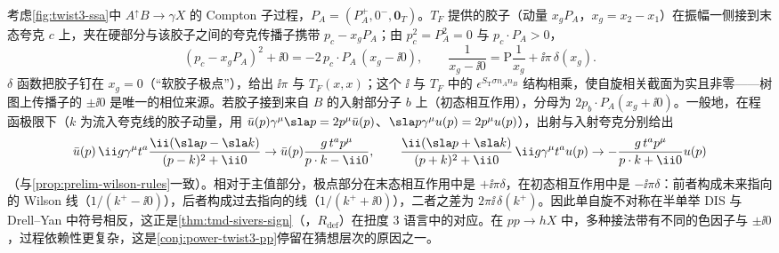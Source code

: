 \begin{example}[最低阶的软胶子极点机制]\label{ex:power-sgp}
考虑\cref{fig:twist3-ssa}中 $A^\uparrow B\to\gamma X$ 的 Compton 子过程，$P_A=(P_A^+,0^-,\mathbf0_T)$。$T_F$ 提供的胶子（动量 $x_gP_A$，$x_g=x_2-x_1$）在振幅一侧接到末态夸克 $c$ 上，夹在硬部分与该胶子之间的夸克传播子携带 $p_c-x_gP_A$；由 $p_c^2=P_A^2=0$ 与 $p_c\cdot P_A>0$，
\begin{equation}\label{eq:power-sgp-den}
(p_c-x_gP_A)^2+\ii0=-2\,p_c\cdot P_A\,(x_g-\ii0),\qquad \frac{1}{x_g-\ii0}=\mathrm P\frac{1}{x_g}+\ii\pi\,\delta(x_g).
\end{equation}
$\delta$ 函数把胶子钉在 $x_g=0$（“软胶子极点”），给出 $\ii\pi$ 与 $T_F(x,x)$；这个 $\ii$ 与 $T_F$ 中的 $\epsilon^{S_{\mathrm T}\sigma n_An_B}$ 结构相乘，使自旋相关截面为实且非零——树图上传播子的 $\pm\ii0$ 是唯一的相位来源。若胶子接到来自 $B$ 的入射部分子 $b$ 上（初态相互作用），分母为 $2p_b\cdot P_A(x_g+\ii0)$。一般地，在程函极限下（$k$ 为流入夸克线的胶子动量，用 $\bar u(p)\gamma^\mu\sla p=2p^\mu\bar u(p)$、$\sla p\gamma^\mu u(p)=2p^\mu u(p)$），出射与入射夸克分别给出
\begin{equation}\label{eq:power-sgp-eik}
\bar u(p)\,\ii g\gamma^\mu t^a\frac{\ii(\sla p-\sla k)}{(p-k)^2+\ii0}\to\bar u(p)\frac{g\,t^ap^\mu}{p\cdot k-\ii0},\qquad
\frac{\ii(\sla p+\sla k)}{(p+k)^2+\ii0}\,\ii g\gamma^\mu t^au(p)\to-\frac{g\,t^ap^\mu}{p\cdot k+\ii0}u(p)
\end{equation}
（与\cref{prop:prelim-wilson-rules}一致）。相对于主值部分，极点部分在末态相互作用中是 $+\ii\pi\delta$，在初态相互作用中是 $-\ii\pi\delta$：前者构成未来指向的 Wilson 线（$1/(k^+-\ii0)$），后者构成过去指向的线（$1/(k^++\ii0)$），二者之差为 $2\pi\ii\,\delta(k^+)$。因此单自旋不对称在半单举 DIS 与 Drell--Yan 中符号相反，这正是\cref{thm:tmd-sivers-sign}（\tagR，$R_{\mathrm{def}}$）在扭度 3 语言中的对应。在 $pp\to hX$ 中，多种接法带有不同的色因子与 $\pm\ii0$，过程依赖性更复杂，这是\cref{conj:power-twist3-pp}停留在猜想层次的原因之一。
\end{example}

